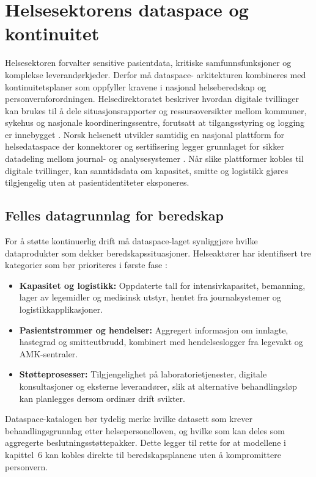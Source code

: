 \section{Helsesektorens dataspace og kontinuitet}
Helsesektoren forvalter sensitive pasientdata, kritiske samfunnsfunksjoner og komplekse leverandørkjeder. Derfor må dataspace-
arkitekturen kombineres med kontinuitetsplaner som oppfyller kravene i nasjonal helseberedskap og personvernforordningen.
Helsedirektoratet beskriver hvordan digitale tvillinger kan brukes til å dele situasjonsrapporter og ressursoversikter mellom
kommuner, sykehus og nasjonale koordineringssentre, forutsatt at tilgangsstyring og logging er innebygget \citep{helsedir2023beredskap}.
Norsk helsenett utvikler samtidig en nasjonal plattform for helsedataspace der konnektorer og sertifisering legger grunnlaget
for sikker datadeling mellom journal- og analysesystemer \citep{nhn2024dataspace}. Når slike plattformer kobles til digitale
tvillinger, kan sanntidsdata om kapasitet, smitte og logistikk gjøres tilgjengelig uten at pasientidentiteter eksponeres.

\subsection{Felles datagrunnlag for beredskap}
For å støtte kontinuerlig drift må dataspace-laget synliggjøre hvilke dataprodukter som dekker beredskapssituasjoner. Helseaktører
har identifisert tre kategorier som bør prioriteres i første fase \citep{helsedir2023beredskap,helseplattformen2023kontinuitet}:
\begin{itemize}
    \item \textbf{Kapasitet og logistikk:} Oppdaterte tall for intensivkapasitet, bemanning, lager av legemidler og medisinsk utstyr,
    hentet fra journalsystemer og logistikkapplikasjoner.
    \item \textbf{Pasientstrømmer og hendelser:} Aggregert informasjon om innlagte, hastegrad og smitteutbrudd, kombinert med
    hendelseslogger fra legevakt og AMK-sentraler.
    \item \textbf{Støtteprosesser:} Tilgjengelighet på laboratorietjenester, digitale konsultasjoner og eksterne leverandører,
    slik at alternative behandlingsløp kan planlegges dersom ordinær drift svikter.
\end{itemize}
Dataspace-katalogen bør tydelig merke hvilke datasett som krever behandlingsgrunnlag etter helsepersonelloven, og hvilke som
kan deles som aggregerte beslutningsstøttepakker. Dette legger til rette for at modellene i kapittel~6 kan kobles direkte til
beredskapsplanene uten å kompromittere personvern.

